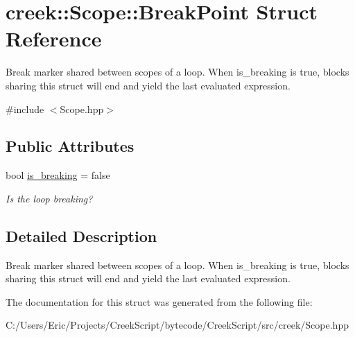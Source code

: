 \hypertarget{structcreek_1_1_scope_1_1_break_point}{}\section{creek\+:\+:Scope\+:\+:Break\+Point Struct Reference}
\label{structcreek_1_1_scope_1_1_break_point}


Break marker shared between scopes of a loop. When {\ttfamily is\+\_\+breaking} is {\ttfamily true}, blocks sharing this struct will end and yield the last evaluated expression.  




{\ttfamily \#include $<$Scope.\+hpp$>$}

\subsection*{Public Attributes}
\begin{DoxyCompactItemize}
\item 
bool \hyperlink{structcreek_1_1_scope_1_1_break_point_a4337035204dbfe5a387252bb8b50098f}{is\+\_\+breaking} = false\hypertarget{structcreek_1_1_scope_1_1_break_point_a4337035204dbfe5a387252bb8b50098f}{}\label{structcreek_1_1_scope_1_1_break_point_a4337035204dbfe5a387252bb8b50098f}

\begin{DoxyCompactList}\small\item\em Is the loop breaking? \end{DoxyCompactList}\end{DoxyCompactItemize}


\subsection{Detailed Description}
Break marker shared between scopes of a loop. When {\ttfamily is\+\_\+breaking} is {\ttfamily true}, blocks sharing this struct will end and yield the last evaluated expression. 

The documentation for this struct was generated from the following file\+:\begin{DoxyCompactItemize}
\item 
C\+:/\+Users/\+Eric/\+Projects/\+Creek\+Script/bytecode/\+Creek\+Script/src/creek/Scope.\+hpp\end{DoxyCompactItemize}
